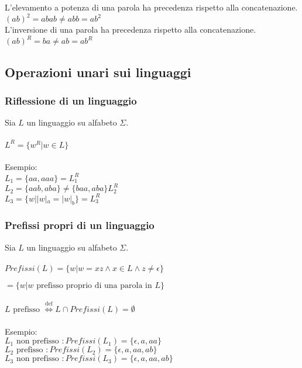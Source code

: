 \documentclass[]{article}
\begin{document}
L'elevamento a potenza di una parola ha precedenza rispetto alla concatenazione.
\\
\mbox{$ (ab)^2 = abab \neq abb = ab^2 $}
\\
L'inversione di una parola ha precedenza rispetto alla concatenazione.
\\
\mbox{$ (ab)^R = ba \neq ab = ab^R $}


\subsection{Operazioni unari sui linguaggi}


\subsubsection{Riflessione di un linguaggio}

Sia \mbox{$ L $} un linguaggio su alfabeto \mbox{$ \Sigma $}.
\\
\\
\mbox{$ L^R = \{ w^R | w \in L \} $}
\\
\\
Esempio:
\\
\mbox{$ L_1 = \{ aa, aaa \} = L_1^R $}
\\
\mbox{$ L_2 = \{ aab, aba \} \neq \{ baa, aba \} L_2^R $}
\\
\mbox{$ L_3 = \{ w | |w|_a = |w|_b \} = L_3^R $}



\subsubsection{Prefissi propri di un linguaggio}

Sia \mbox{$ L $} un linguaggio su alfabeto \mbox{$ \Sigma $}.
\\
\\
\mbox{$ Prefissi(L) = \{ w | w = xz \land x \in L \land z \neq \epsilon \} $}

\mbox{$ = \{ w | w \text{ prefisso proprio di una parola in } L \} $}
\\
\\
\mbox{$ L \text{ prefisso } \overset{\text{def}}{\Leftrightarrow}
L \cap Prefissi(L) = \emptyset $}
\\
\\
Esempio:
\\
\mbox{$ L_1 \text{ non prefisso } \colon Prefissi(L_1) = \{ \epsilon, a, aa \} $}
\\
\mbox{$ L_2 \text{ prefisso } \colon Prefissi(L_2) = \{ \epsilon, a, aa, ab \} $}
\\
\mbox{$ L_3 \text{ non prefisso } \colon Prefissi(L_3) = \{ \epsilon, a, aa, ab \} $}
\end{document}

